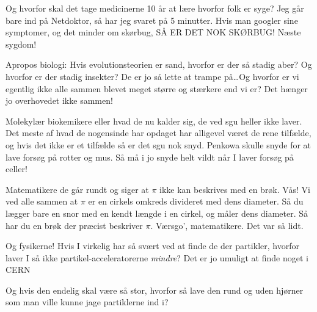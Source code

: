 \documentclass[a4paper,11pt]{article}
\begin{document}
\begin{sketch}
 Og hvorfor skal det tage medicinerne 10 år at lære hvorfor
folk er syge?  Jeg går bare ind på Netdoktor, så har jeg svaret på 5
minutter. Hvis man googler sine symptomer, og det minder om skørbug,
SÅ ER DET NOK SKØRBUG!  Næste sygdom!

 Apropos biologi: Hvis evolutionsteorien er sand, hvorfor er der så
stadig aber?  Og hvorfor er der stadig insekter? De er jo så lette at
trampe på\ldots Og hvorfor er vi egentlig ikke alle sammen blevet meget større og stærkere end vi er?
Det hænger jo overhovedet ikke sammen!

 Molekylær biokemikere eller hvad de nu kalder sig, de ved sgu heller ikke laver.
Det meste af hvad de nogensinde har opdaget har alligevel været de rene tilfælde, og hvis det ikke er et tilfælde så er det sgu nok snyd.
Penkowa skulle snyde for at lave forsøg på rotter og mus. Så må i jo snyde helt vildt når I laver forsøg på celler!

\begin{comment}
\says{A} Rollespillere er kendt for at være meget overtroiske, men der
er faktisk noget om snakken: Vi ved jo alle at en terning gennem sit
liv vil slå et bestemt antal 6'ere, så hvis man slår en 6'er med den,
vil den derfor have én færre sekser tilbage, og derved er terningens
kvalitet blevet reduceret.  Ja, selv noget så simpel, er det tydeligt,
at matematikerne er for dumme til at forstå.
\end{comment}

 Matematikere de går rundt og siger at $\pi$ ikke kan beskrives med en
brøk. Vås! Vi ved alle sammen at $\pi$ er en cirkels omkreds divideret
med dens diameter. Så du lægger bare en snor med en kendt længde i en
cirkel, og måler dens diameter. Så har du en brøk der præcist
beskriver $\pi$. Værsgo', matematikere. Det var så lidt.


  Og fysikerne! Hvis I virkelig
har så svært ved at finde de der partikler, hvorfor laver I så ikke
partikel-acceleratorerne \textit{mindre}? Det er jo umuligt at finde
noget i CERN

 Og hvis den endelig skal være så stor, hvorfor så lave den
rund og uden hjørner som man ville kunne jage partiklerne ind i?

\begin{comment}
\says{A} Fysikerne påstår endvidere, at mængden af energi i universet
er konstant. \act{Suk.} 0) Sæt en lille vandmølle på vandhanen, 1)
Tænd for vandhanen, 2) uendelig energi!  Fysikerne påstår også at
varme er energi, men jeg tænder for en lighter eller skruer op for min
radiator, så bliver der varmere. Ergo har jeg igen tilføjet energi til
universet!
\end{comment}


\end{sketch}
\end{document}
